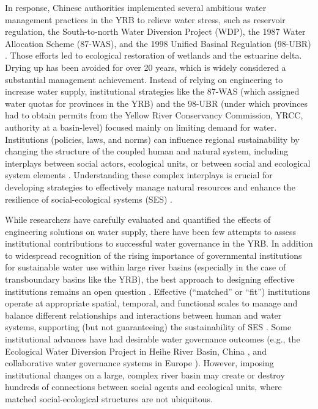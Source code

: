 In response, Chinese authorities implemented several ambitious water management practices in the YRB to relieve water stress, such as reservoir regulation, the South-to-north Water Diversion Project (WDP), the 1987 Water Allocation Scheme (87-WAS), and the 1998 Unified Basinal Regulation (98-UBR) \cite{long2020, wang2019d}.
Those efforts led to ecological restoration of wetlands and the estuarine delta. Drying up has been avoided for over 20 years, which is widely considered a substantial management achievement.
Instead of relying on engineering to increase water supply, institutional strategies like the 87-WAS (which assigned water quotas for provinces in the YRB) and the 98-UBR (under which provinces had to obtain permits from the Yellow River Conservancy Commission, YRCC, authority at a basin-level) focused mainly on limiting demand for water.
Institutions (policies, laws, and norms) can influence regional sustainability by changing the structure of the coupled human and natural system, including interplays between social actors, ecological units, or between social and ecological system elements
\cite{young2008,cumming2020b,lien2020, bodin2017b}.
Understanding these complex interplays is crucial for developing strategies to effectively manage natural resources and enhance the resilience of social-ecological systems (SES) \cite{kluger2020}.

While researchers have carefully evaluated and quantified the effects of engineering solutions on water supply\cite{long2020}, there have been few attempts to assess institutional contributions to successful water governance in the YRB.
In addition to widespread recognition of the rising importance of governmental institutions for sustainable water use within large river basins (especially in the case of transboundary basins like the YRB), the best approach to designing effective institutions remains an open question \cite{agrawal2003, persha2011, agrawal2001}.
Effective (``matched'' or ``fit'') institutions operate at appropriate spatial, temporal, and functional scales to manage and balance different relationships and interactions between human and water systems, supporting (but not guaranteeing) the sustainability of SES \cite{epstein2015, wang2019d}.
Some institutional advances have had desirable water governance outcomes (e.g., the Ecological Water Diversion Project in Heihe River Basin, China \cite{wang2019d}, and collaborative water governance systems in Europe \cite{green2013}).
However, imposing institutional changes on a large, complex river basin may create or destroy hundreds of connections between social agents and ecological units, where matched social-ecological structures are not ubiquitous.

